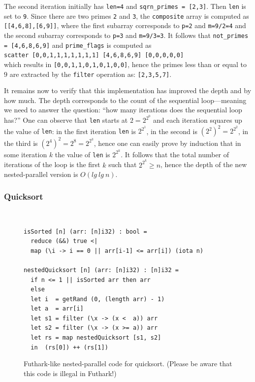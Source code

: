 \documentclass[acmsmall,review]{acmart}\settopmatter{printfolios=true,printccs=false,printacmref=false}
\begin{document}
The second iteration initially has {\tt len=4} and 
{\tt sqrn\_primes = [2,3]}. Then {\tt len} is set to {\tt 9}.
Since there are two primes {\tt 2} and {\tt 3}, the
{\tt composite} array is computed as {\tt [[4,6,8],[6,9]]},
where the first subarray corresponds to {\tt p=2} and {\tt m=9/2=4}
and the second subarray corresponds to {\tt p=3} and {\tt m=9/3=3}.
It follows that {\tt not\_primes = [4,6,8,6,9]} and
{\tt prime\_flags} is computed as\\
\lstinline{scatter [0,0,1,1,1,1,1,1,1] [4,6,8,6,9] [0,0,0,0,0]}\\
which results in {\tt [0,0,1,1,0,1,0,1,0,0]}, hence the
primes less than or equal to $9$ are extracted by the
\lstinline{filter} operation as: {\tt[2,3,5,7]}.

\medskip

It remains now to verify that this implementation has improved the
depth and by how much.
The depth corresponds to the count of the sequential 
loop---meaning we need to answer the question: ``how many iterations
does the sequential loop has?''   One can observe that {\tt len} 
starts at $2=2^{2^0}$ and each iteration squares up the value of {\tt len}:
in the first iteration {\tt len} is $2^{2^1}$, in the second is $(2^2)^2=2^{2^2}$,
in the third is $(2^4)^2=2^8=2^{2^3}$, hence one can easily
prove by induction that in some iteration $k$ the value of {\tt len} 
is $2^{2^k}$.
It follows that the total number of iterations of the loop
is the first $k$ such that $2^{2^k} \geq n$, hence the depth of 
the new nested-parallel version is $O(lg~lg~n)$.

\newpage
\subsubsection{Quicksort}
\label{subsubsub:quicksort}
$\mbox{ }$\\

\begin{figure}
\begin{lstlisting}[mathescape=true]
isSorted [n] (arr: [n]i32) : bool =
  reduce (&&) true <|
  map (\i -> i == 0 || arr[i-1] <= arr[i]) (iota n)

nestedQuicksort [n] (arr: [n]i32) : [n]i32 = 
  if n <= 1 || isSorted arr then arr
  else
  let i  = getRand (0, (length arr) - 1)
  let a  = arr[i]
  let s1 = filter (\x -> (x <  a)) arr
  let s2 = filter (\x -> (x >= a)) arr
  let rs = map nestedQuicksort [s1, s2]
  in  (rs[0]) ++ (rs[1])
\end{lstlisting}\vspace{-4ex}
\caption{Futhark-like nested-parallel code for quicksort. (Please be aware that this code is illegal in Futhark!)}
\label{fig:quicksort-nested-par-Futhark}
\end{figure}
\end{document}
